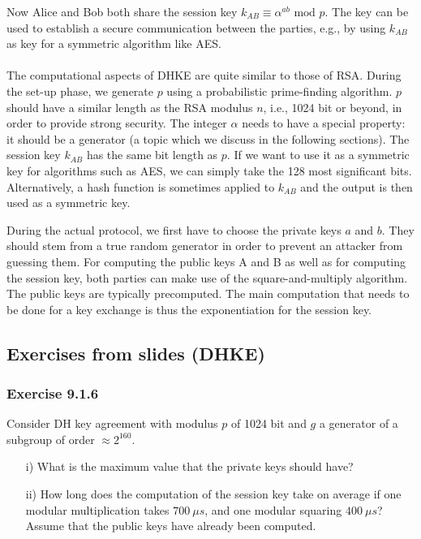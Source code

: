 \documentclass[11pt, a4paper]{article}
\newcommand{\mymod}{
    \text{ mod }
}
\begin{document}
Now Alice and Bob both share the session key $k_{AB}\equiv\alpha^{ab}\mymod p$. The key can be used to establish a secure communication between the parties, e.g., by using $k_{AB}$ as key for a symmetric algorithm like AES.\\\\
The computational aspects of DHKE are quite similar to those of RSA. During the set-up phase, we generate $p$ using a probabilistic prime-finding algorithm. $p$ should have a similar length as the RSA modulus $n$, i.e., 1024 bit or beyond, in order to provide strong security. The integer $\alpha$ needs to have a special property: it should be a generator (a topic which we discuss in the following sections). The session key $k_{AB}$ has the same bit length as $p$. If we want to use it as a symmetric key for algorithms such as AES, we can simply take the 128 most significant bits. Alternatively, a hash function is sometimes applied to $k_{AB}$ and the output is then used as a symmetric key.

\newpage
\hfill\break
During the actual protocol, we first have to choose the private keys $a$ and $b$. They should stem from a true random generator in order to prevent an attacker from guessing them. For computing the public keys A and B as well as for computing the session key, both parties can make use of the square-and-multiply algorithm. The public keys are typically precomputed. The main computation that needs to be done for a key exchange is thus the exponentiation for the session key.

\subsection{Exercises from slides (DHKE)}
\subsubsection{Exercise 9.1.6}
Consider DH key agreement with modulus $p$ of 1024 bit and $g$ a generator of a subgroup of order $\approx2^{160}$.
\begin{itemize}
    \item[i)] What is the maximum value that the private keys should have?
    \item[ii)] How long does the computation of the session key take on average if one modular multiplication takes $700\ \mu s$, and one modular squaring $400\ \mu s$? Assume that the public keys have already been computed.
\end{itemize}
\end{document}
